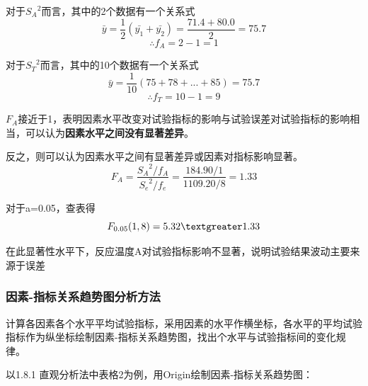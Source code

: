 \documentclass[UTF8]{ctexart}
\begin{document}
\par 对于${S_A}^2$而言，其中的2个数据有一个关系式
\begin{equation}
\bar{y}=\frac{1}{2}(\bar{y_1}+\bar{y_2})=\frac{71.4+80.0}{2}=75.7
\end{equation}
\begin{equation}
\therefore f_{A}=2-1=1
\end{equation}
\par 对于${S_T}^2$而言，其中的10个数据有一个关系式
\begin{equation}
\bar{y}=\frac{1}{10}(75+78+...+85)=75.7
\end{equation}
\begin{equation}
\therefore f_{T}=10-1=9
\end{equation}
\par $F_{A}$接近于1，表明因素水平改变对试验指标的影响与试验误差对试验指标的影响相当，可以认为\textbf{因素水平之间没有显著差异}。
\par 反之，则可以认为因素水平之间有显著差异或因素对指标影响显著。
\begin{equation}
F_{A}=\frac{{S_A}^{2}/f_{A}}{{S_e}^{2}/f_{e}}=\frac{184.90/1}{1109.20/8}=1.33
\end{equation}
\par 对于a=0.05，查表得
\begin{equation}
F_{0.05}(1,8)=5.32\textgreater1.33
\end{equation}
\par 在此显著性水平下，反应温度A对试验指标影响不显著，说明试验结果波动主要来源于误差
\subsubsection{因素-指标关系趋势图分析方法}
\par 计算各因素各个水平平均试验指标，采用因素的水平作横坐标，各水平的平均试验指标作为纵坐标绘制因素-指标关系趋势图，找出个水平与试验指标间的变化规律。
\par 以1.8.1 直观分析法中表格2为例，用Origin绘制因素-指标关系趋势图：
\end{document}
